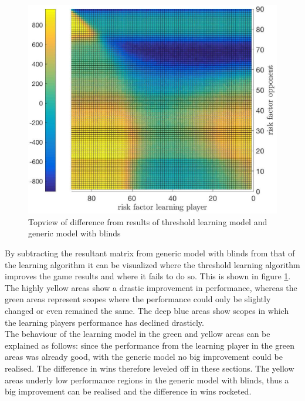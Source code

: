 \documentclass[11pt]{article}
\begin{document}
\begin{figure}
\begin{center}
\includegraphics[scale=.3]{Graphics/allDataWins_Threshold_Difference}
\end{center}
\caption{Topview of difference from results of threshold learning model and generic model with blinds}
\label{allDataWins_Threshold_Difference}
\end{figure}

By subtracting the resultant matrix from generic model with blinds from that of the learning algorithm it can be visualized where the threshold learning algorithm improves the game results and where it fails to do so. This is shown in figure \ref{allDataWins_Threshold_Difference}. The highly yellow areas show a drastic improvement in performance, whereas the green areas represent scopes where the performance could only be slightly changed or even remained the same. The deep blue areas show scopes in which the learning players performance has declined drasticly.\\

The behaviour of the learning model in the green and yellow areas can be explained as follows: since the performance from the learning player in the green areas was already good, with the generic model no big improvement could be realised. The difference in wins therefore leveled off in these sections. The yellow areas underly low performance regions in the generic model with blinds, thus a big improvement can be realised and the difference in wins rocketed.\\
\end{document}
